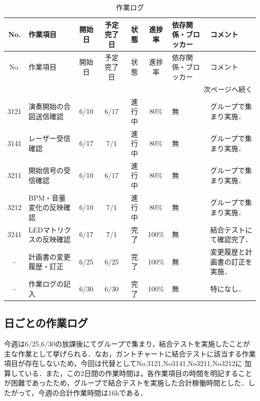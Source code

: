 \documentclass[uplatex,dvipdfmx,a4paper,11pt]{jsarticle}
\begin{document}
\begin{longtable}{|c|p{2.2cm}|c|c|c|c|p{2.4cm}|p{3.1cm}|}
\caption{作業ログ} \\
\hline
No. & 作業項目 & 開始日 & 予定完了日 & 状態 & 進捗率 & 依存関係・ブロッカー & コメント \\
\hline
\endfirsthead

\hline
No. & 作業項目 & 開始日 & 予定完了日 & 状態 & 進捗率 & 依存関係・ブロッカー & コメント \\
\hline
\endhead

\hline
\multicolumn{8}{r}{次ページへ続く} \\
\hline
\endfoot

\hline
\endlastfoot

3121 &
演奏開始の合図送信確認 &
6/10 &
6/17 &
進行中 &
80\% &
無 &
グループで集まり実施．\\
\hline

3141 &
レーザー受信確認 &
6/17 &
7/1 &
進行中 &
80\% &
無 &
グループで集まり実施．\\
\hline

3211 &
開始信号の受信確認 &
6/10 &
6/17 &
進行中 &
80\% &
無 &
グループで集まり実施．\\
\hline

3212 &
BPM・音量変化の反映確認 &
6/10 &
7/1 &
進行中 &
80\% &
無 &
グループで集まり実施．\\
\hline

3241 &
LEDマトリクスの反映確認 &
6/17 &
7/1 &
完了 &
100\% &
無 &
結合テストにて確認完了．\\
\hline

- &
計画書の変更履歴・訂正 &
6/25 &
6/25 &
完了 &
100\% &
無 &
変更履歴と計画書の訂正を実施．\\
\hline

- &
作業ログの記入 &
6/30 &
6/30 &
完了 &
100\% &
無 &
特になし．\\
\hline



\end{longtable}


\subsection{日ごとの作業ログ}
 今週は6/25,6/30の放課後にてグループで集まり，結合テストを実施したことが主な作業として挙げられる．なお，ガントチャートに結合テストに該当する作業項目が存在しないため，今回は代替としてNo.3121,No3141,No3211,No3212に
 加算している．また，この2日間の作業時間は，各作業項目の時間を明記することが困難であったため，グループで結合テストを実施した合計稼働時間とした．したがって，今週の合計作業時間は16hである．
\end{document}
